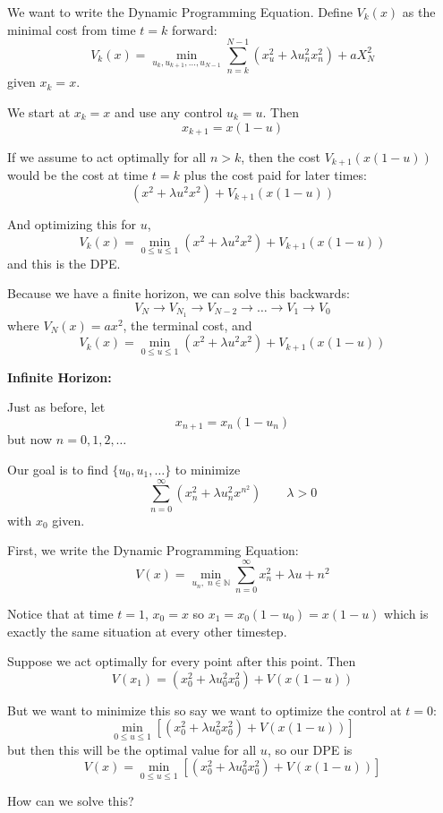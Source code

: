 \documentclass[12pt]{article}
\newcommand{\N}{\mathbb{N}}
\begin{document}
\begin{center}
    We want to write the Dynamic Programming Equation. Define $V_k(x)$ as the minimal cost from time $t= k$ forward:
    \[V_k(x) = \min_{u_k, u_{k+1}, \dots, u_{N-1}} \sum_{n=k}^{N-1} (x_u^2 + \lambda u_n^2 x_n^2) + a X_N^2\]
    given $x_k = x$.  
    
    We start at $x_k = x$ and use any control $u_k = u$. Then 
    \[x_{k+1} = x(1 - u)\]

    If we assume to act optimally for all $n > k$, then the cost $V_{k+1}(x(1 - u))$
    would be the cost at time $t = k$ plus the cost paid for later times: 
    \[(x^2 + \lambda u^2 x^2) + V_{k+1}(x(1 - u))\]

    And optimizing this for $u$, 
    \[V_k(x) = \min_{0 \leq u \leq 1} (x^2 + \lambda u^2 x^2) + V_{k+1}(x(1 - u))\]
    and this is the DPE. 

    Because we have a finite horizon, we can solve this backwards: 
    \[V_N \to V_{N_1} \to V_{N-2} \to \dots \to V_1 \to V_0\]
    where $V_N(x) =ax^2$, the terminal cost, and 
    \[V_k(x) = \min_{0 \leq u \leq 1} (x^2 + \lambda u^2 x^2) + V_{k+1}(x(1 - u))\]
    
    \textbf{Infinite Horizon:}
    
        Just as before, let 
        \[x_{n+1} = x_n (1 - u_n)\]
        but now $n = 0, 1, 2, \dots$ 
        
        Our goal is to find $\{u_0, u_1, \dots\}$ to minimize 
        \[\sum_{n=0}^{\infty} (x_n^2 + \lambda u_n^2 x^n^2) \qquad \lambda > 0\]
        with $x_0$ given.

        First, we write the Dynamic Programming Equation:
        \[V(x) = \min_{u_n,\; n\in \N} \sum_{n=0}^\infty x_n^2 + \lambda u+n^2\]

        Notice that at time $t = 1$, $x_0 = x$ so $x_1 = x_0(1 - u_0) = x(1 - u)$ which is exactly the same situation at every other timestep. 

        Suppose we act optimally for every point after this point. Then 
        \[V(x_1) = (x_0^2 + \lambda u_0^2 x_0^2) + V(x(1- u))\]

        But we want to minimize this so say we want to optimize the control at $t = 0$: 
        \[\min_{0\leq u \leq 1} \left[(x_0^2 + \lambda u_0^2 x_0^2) + V(x(1- u))\right]\]
        but then this will be the optimal value for all $u$, so our DPE is 
        \[V(x) = \min_{0\leq u \leq 1} \left[(x_0^2 + \lambda u_0^2 x_0^2) + V(x(1- u))\right] \]

        How can we solve this? 


\end{center}
\end{document}
